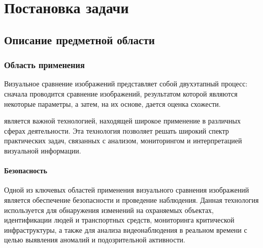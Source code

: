 \documentclass[variant=courcework]{bsuir}
\begin{document}
\chapter{Постановка задачи}

\section{Описание предметной области}




\subsection{Область применения}
Визуальное сравнение изображений представляет собой двухэтапный процесс: сначала
проводится сравнение изображений, результатом которой являются некоторые
параметры, а затем, на их основе, дается оценка схожести. 

является важной технологией, находящей широкое
применение в различных сферах деятельности. Эта технология позволяет решать
широкий спектр практических задач, связанных с анализом, мониторингом и
интерпретацией визуальной информации.

\subsubsection{Безопасность}
Одной из ключевых областей применения визуального сравнения изображений является
обеспечение безопасности и проведение наблюдения. Данная технология используется
для обнаружения изменений на охраняемых объектах, идентификации людей и
транспортных средств, мониторинга критической инфраструктуры, а также для
анализа видеонаблюдения в реальном времени с целью выявления аномалий и
подозрительной активности.
\end{document}
